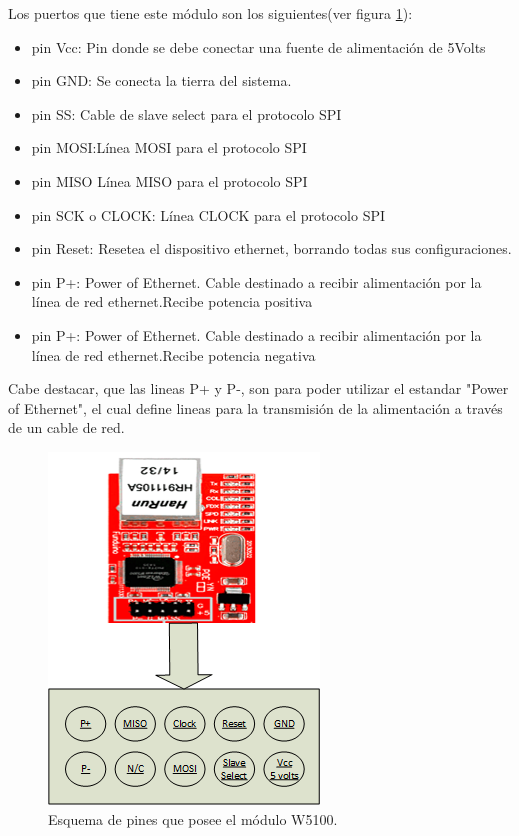 Los puertos que tiene este módulo son los siguientes(ver figura \ref{fig:ap_ethernet}):

\begin{itemize}
	\item pin Vcc: Pin donde se debe conectar una fuente de alimentación de 5Volts
	\item pin GND: Se conecta la tierra del sistema. 
	\item pin SS: Cable de slave select para el protocolo SPI 
	\item pin MOSI:Línea MOSI para el protocolo SPI  
	\item pin MISO Línea MISO para el protocolo SPI  
	\item pin SCK o CLOCK: Línea CLOCK para el protocolo SPI  
	\item pin Reset: Resetea el dispositivo ethernet, borrando todas sus configuraciones. 
	\item pin P+: Power of Ethernet. Cable destinado a recibir alimentación por la línea de red ethernet.Recibe potencia positiva 
	\item pin P+: Power of Ethernet. Cable destinado a recibir alimentación por la línea de red ethernet.Recibe potencia negativa  
\end{itemize}

Cabe destacar, que las lineas P+ y P-, son para poder utilizar el estandar "Power of Ethernet", el cual define lineas para la transmisión de la alimentación a través de un cable de red. 

\begin{figure}[ht]
	\centering 
	\includegraphics{parte_2/soft_micro/pinoutW5100}
	\caption{Esquema de pines que posee el módulo W5100.} 
	\label{fig:ap_ethernet}
\end{figure}

